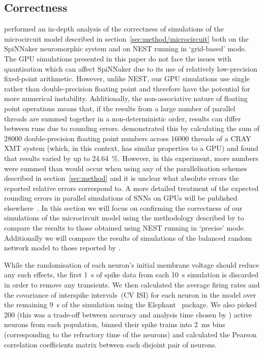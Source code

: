 \documentclass[utf8]{frontiersSCNS} %
\begin{document}
\subsection{Correctness}
\label{sec:results/correctness}
\citet{VanAlbada2018} performed an in-depth analysis of the correctness of simulations of the microcircuit model described in section~\ref{sec:method/microcircuit} \citep{Potjans2012}  both on the SpiNNaker neuromorphic system and on NEST running in `grid-based' mode.
The GPU simulations presented in this paper do not face the issues with quantisation which can affect SpiNNaker due to its use of relatively low-precision fixed-point arithmetic.
However, unlike NEST, our GPU simulations use single rather than double-precision floating point and therefore have the potential for more numerical instability.
Additionally, the non-associative nature of floating point operations means that, if the results from a large number of parallel threads are summed together in a non-deterministic order, results can differ between runs due to rounding errors.
\citet{Villa2009} demonstrated this by calculating the sum of \num{28000} double-precision floating point numbers across \num{16000} threads of a CRAY XMT system (which, in this context, has similar properties to a GPU) and found that results varied by up to \SI{24.64}{\percent}.
However, in this experiment, more numbers were summed than would occur when using any of the parallelisation schemes described in section~\ref{sec:method} and it is unclear what absolute errors the reported relative errors correspond to. 
A more detailed treatment of the expected rounding errors in parallel simulations of SNNs on GPUs will be published elsewhere~\citep{Turner2019}. 
In this section we will focus on confirming the correctness of our simulations of the microcircuit model using the methodology described by \citet{VanAlbada2018} to compare the results to those obtained using NEST running in `precise' mode.
Additionally we will compare the results of simulations of the balanced random network model to those reported by \citet{Morrison2007}.

While the randomisation of each neuron's initial membrane voltage should reduce any such effects, the first \SI{1}{\second} of spike data from each \SI{10}{\second} simulation is discarded in order to remove any transients.
We then calculated the average firing rates and the covariance of interspike intervals~(CV ISI) for each neuron in the model over the remaining \SI{9}{\second} of the simulation using the Elephant~\citep{Yegenoglu2018} package.
We also picked \num{200} (this was a trade-off between accuracy and analysis time chosen by \citeauthor{VanAlbada2018}) active neurons from each population, binned their spike trains into \SI{2}{\milli\second} bins (corresponding to the refractory time of the neurons) and calculated the Pearson correlation coefficients matrix between each disjoint pair of neurons.
\end{document}
